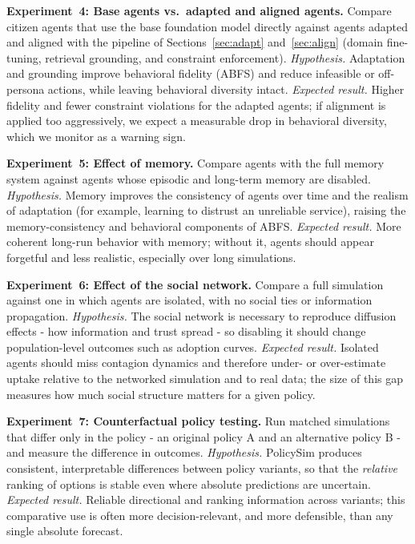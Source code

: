 \documentclass[conference]{IEEEtran}
\begin{document}
\textbf{Experiment~4: Base agents vs.\ adapted and aligned agents.}
Compare citizen agents that use the base foundation model directly against agents adapted and aligned with the pipeline of Sections~\ref{sec:adapt} and~\ref{sec:align} (domain fine-tuning, retrieval grounding, and constraint enforcement).
\emph{Hypothesis.} Adaptation and grounding improve behavioral fidelity (ABFS) and reduce infeasible or off-persona actions, while leaving behavioral diversity intact.
\emph{Expected result.} Higher fidelity and fewer constraint violations for the adapted agents; if alignment is applied too aggressively, we expect a measurable drop in behavioral diversity, which we monitor as a warning sign.

\textbf{Experiment~5: Effect of memory.}
Compare agents with the full memory system against agents whose episodic and long-term memory are disabled.
\emph{Hypothesis.} Memory improves the consistency of agents over time and the realism of adaptation (for example, learning to distrust an unreliable service), raising the memory-consistency and behavioral components of ABFS.
\emph{Expected result.} More coherent long-run behavior with memory; without it, agents should appear forgetful and less realistic, especially over long simulations.

\textbf{Experiment~6: Effect of the social network.}
Compare a full simulation against one in which agents are isolated, with no social ties or information propagation.
\emph{Hypothesis.} The social network is necessary to reproduce diffusion effects - how information and trust spread - so disabling it should change population-level outcomes such as adoption curves.
\emph{Expected result.} Isolated agents should miss contagion dynamics and therefore under- or over-estimate uptake relative to the networked simulation and to real data; the size of this gap measures how much social structure matters for a given policy.

\textbf{Experiment~7: Counterfactual policy testing.}
Run matched simulations that differ only in the policy - an original policy A and an alternative policy B - and measure the difference in outcomes.
\emph{Hypothesis.} PolicySim produces consistent, interpretable differences between policy variants, so that the \emph{relative} ranking of options is stable even where absolute predictions are uncertain.
\emph{Expected result.} Reliable directional and ranking information across variants; this comparative use is often more decision-relevant, and more defensible, than any single absolute forecast.
\end{document}
